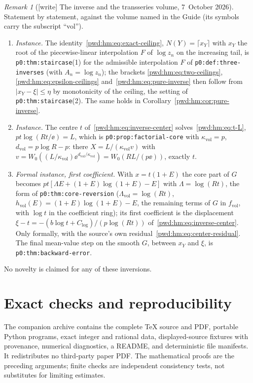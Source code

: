 \documentclass[11pt,letterpaper]{article}
\numberwithin{equation}{section}
\theoremstyle{remark}\newtheorem{remark}[theorem]{Remark}
\newcommand{\file}[1]{\nolinkurl{#1}}
\newcommand{\vol}{\mathrm{vol}}
\begin{document}
\begin{remark}[{[write]} The inverse and the transseries volume, 7~October 2026]\label{pwd:hm:rem:transseries}
Statement by statement, against the volume named in the Guide (its symbols
carry the subscript ``vol'').
\begin{enumerate}[label=(\alph*),leftmargin=*]
\item \emph{Instance.} The identity~\eqref{pwd:hm:eq:exact-ceiling},
$N(Y)=\lceil x_Y\rceil$ with $x_Y$ the root of the piecewise-linear
interpolation $F$ of $\log z_n$ on the increasing tail, is
\file{p0:thm:staircase}(1) for the admissible interpolation $F$ of
\file{p0:def:three-inverses} (with $A_n=\log z_n$); the brackets
\eqref{pwd:hm:eq:two-ceilings}, \eqref{pwd:hm:eq:epsilon-ceilings}
and~\eqref{pwd:hm:eq:pure-inverse} then follow from $|x_Y-\xi|\le\eta$ by
monotonicity of the ceiling, the setting of \file{p0:thm:staircase}(2). The
same holds in Corollary~\ref{pwd:hm:cor:pure-inverse}.
\item \emph{Instance.} The centre $t$ of~\eqref{pwd:hm:eq:inverse-center}
solves~\eqref{pwd:hm:eq:t-L}, $pt\log(Rt/\ee)=L$, which is
\file{p0:prop:factorial-core} with $\kappa_\vol=p$, $d_\vol=p\log R-p$:
there $X=L/(\kappa_\vol v)$ with $v=W_0((L/\kappa_\vol)\ee^{d_\vol/\kappa_\vol})
=W_0(RL/(p\ee))$, exactly $t$.
\item \emph{Formal instance, first coefficient.} With $x=t(1+E)$ the core
part of $G$ becomes $pt[\Lambda E+(1+E)\log(1+E)-E]$ with
$\Lambda=\log(Rt)$, the form of \file{p0:thm:core-reversion}
($\Lambda_\vol=\log(Rt)$, $h_\vol(E)=(1+E)\log(1+E)-E$, the remaining terms
of $G$ in $f_\vol$, with $\log t$ in the coefficient ring); its first
coefficient is the displacement $\xi-t=-(b\log t+C_{\log})/(p\log(Rt))$
of~\eqref{pwd:hm:eq:inverse-center}. Only formally, with the source's own
residual~\eqref{pwd:hm:eq:center-residual}. The final mean-value step on the
smooth $G$, between $x_Y$ and $\xi$, is \file{p0:thm:backward-error}.
\end{enumerate}
No novelty is claimed for any of these inversions.
\end{remark}

\section{Exact checks and reproducibility}\label{pwd:hm:sec:repro}
The companion archive contains the complete TeX source and PDF, portable Python programs, exact integer and rational data, displayed-source fixtures with provenance, numerical diagnostics, a README, and deterministic file manifests. It redistributes no third-party paper PDF. The mathematical proofs are the preceding arguments; finite checks are independent consistency tests, not substitutes for limiting estimates.
\end{document}
